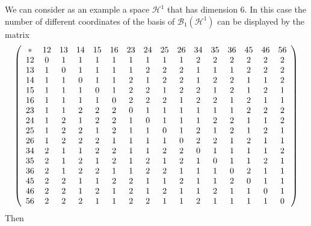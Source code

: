 \documentclass[aps,preprint]{revtex4}%
\begin{document}
We can consider as an example a space $\mathcal{H}^{1}$ that has dimension
$6$. In this case the number of different coordinates of the basis of
$\mathcal{B}_{1}\left(  \mathcal{H}^{1}\right)  $ can be displayed by the
matrix
\begin{equation}
\left(
\begin{array}
[c]{cccccccccccccccc}%
\ast & 12 & 13 & 14 & 15 & 16 & 23 & 24 & 25 & 26 & 34 & 35 & 36 & 45 & 46 &
56\\
12 & 0 & 1 & 1 & 1 & 1 & 1 & 1 & 1 & 1 & 2 & 2 & 2 & 2 & 2 & 2\\
13 & 1 & 0 & 1 & 1 & 1 & 1 & 2 & 2 & 2 & 1 & 1 & 1 & 2 & 2 & 2\\
14 & 1 & 1 & 0 & 1 & 1 & 2 & 1 & 2 & 2 & 1 & 2 & 2 & 1 & 1 & 2\\
15 & 1 & 1 & 1 & 0 & 1 & 2 & 2 & 1 & 2 & 2 & 1 & 2 & 1 & 2 & 1\\
16 & 1 & 1 & 1 & 1 & 0 & 2 & 2 & 2 & 1 & 2 & 2 & 1 & 2 & 1 & 1\\
23 & 1 & 1 & 2 & 2 & 2 & 0 & 1 & 1 & 1 & 1 & 1 & 1 & 2 & 2 & 2\\
24 & 1 & 2 & 1 & 2 & 2 & 1 & 0 & 1 & 1 & 1 & 2 & 2 & 1 & 1 & 2\\
25 & 1 & 2 & 2 & 1 & 2 & 1 & 1 & 0 & 1 & 2 & 1 & 2 & 1 & 2 & 1\\
26 & 1 & 2 & 2 & 2 & 1 & 1 & 1 & 1 & 0 & 2 & 2 & 1 & 2 & 1 & 1\\
34 & 2 & 1 & 1 & 2 & 2 & 1 & 1 & 2 & 2 & 0 & 1 & 1 & 1 & 1 & 2\\
35 & 2 & 1 & 2 & 1 & 2 & 1 & 2 & 1 & 2 & 1 & 0 & 1 & 1 & 2 & 1\\
36 & 2 & 1 & 2 & 2 & 1 & 1 & 2 & 2 & 1 & 1 & 1 & 0 & 2 & 1 & 1\\
45 & 2 & 2 & 1 & 1 & 2 & 2 & 1 & 1 & 2 & 1 & 1 & 2 & 0 & 1 & 1\\
46 & 2 & 2 & 1 & 2 & 1 & 2 & 1 & 2 & 1 & 1 & 2 & 1 & 1 & 0 & 1\\
56 & 2 & 2 & 2 & 1 & 1 & 2 & 2 & 1 & 1 & 2 & 1 & 1 & 1 & 1 & 0
\end{array}
\right)
\end{equation}
Then
\end{document}
